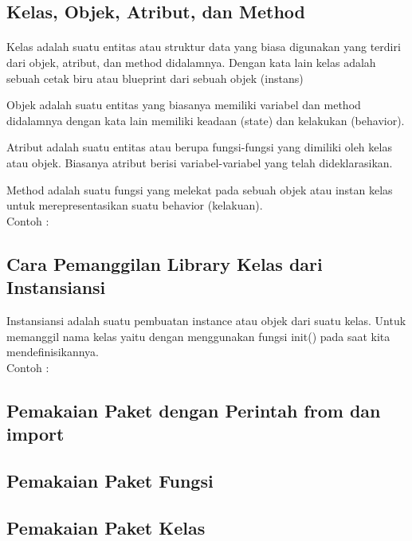 \subsection{Kelas, Objek, Atribut, dan Method}
\paragraph{}
Kelas adalah suatu entitas atau struktur data yang biasa digunakan yang terdiri dari objek, atribut, dan method didalamnya. Dengan kata lain kelas adalah sebuah cetak biru atau blueprint dari sebuah objek (instans)

Objek adalah suatu entitas yang biasanya memiliki variabel dan method didalamnya dengan kata lain memiliki keadaan (state) dan kelakukan (behavior).

Atribut adalah suatu entitas atau berupa fungsi-fungsi yang dimiliki oleh kelas atau objek. Biasanya atribut berisi variabel-variabel yang telah dideklarasikan.

Method adalah suatu fungsi yang melekat pada sebuah objek atau instan kelas untuk merepresentasikan suatu behavior (kelakuan).\\
Contoh :


\subsection{Cara Pemanggilan Library Kelas dari Instansiansi}
Instansiansi adalah suatu pembuatan instance atau objek dari suatu kelas. Untuk memanggil nama kelas yaitu dengan menggunakan fungsi init() pada saat kita mendefinisikannya.\\
Contoh :


\subsection{Pemakaian Paket dengan Perintah from dan import}


\subsection{Pemakaian Paket Fungsi}


\subsection{Pemakaian Paket Kelas}


